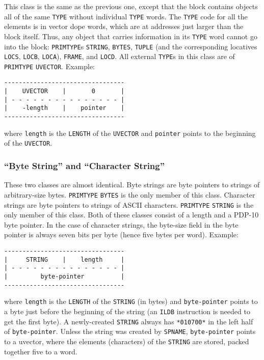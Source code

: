 \documentclass[a4paper]{scrbook}
\begin{document}
This class is the same as the previous one, except that the block contains objects all of the same \texttt{TYPE} without
individual \texttt{TYPE} words. The \texttt{TYPE} code for all the elements is in vector dope words, which are at addresses
just larger than the block itself. Thus, any object that carries information in its \texttt{TYPE} word cannot go into the
block: \texttt{PRIMTYPE}s \texttt{STRING}, \texttt{BYTES}, \texttt{TUPLE} (and
the corresponding locatives \texttt{LOCS}, \texttt{LOCB}, \texttt{LOCA}), \texttt{FRAME}, and
\texttt{LOCD}. All external \texttt{TYPE}s in this class are of \texttt{PRIMTYPE}
\texttt{UVECTOR}. Example:

\begin{verbatim}
---------------------------------
|    UVECTOR    |       0       |
| - - - - - - - - - - - - - - - |
|    -length    |    pointer    |
---------------------------------
\end{verbatim}

where \texttt{length} is the \texttt{LENGTH} of the \texttt{UVECTOR} and \texttt{pointer} points to the beginning of the
\texttt{UVECTOR}.

\subsubsection*{\texorpdfstring{``Byte String'' and ``Character
String''}{Byte String and Character String}}\label{byte-string-and-character-string}

These two classes are almost identical. Byte strings are byte pointers to strings of arbitrary-size bytes.
\texttt{PRIMTYPE} \texttt{BYTES} is the only member of this class. Character strings are byte pointers to strings of ASCII
characters. \texttt{PRIMTYPE} \texttt{STRING} is the only member of this class. Both of these classes consist of a length
and a PDP-10 byte pointer. In the case of character strings, the byte-size field in the byte pointer is always seven bits
per byte (hence five bytes per word). Example:

\begin{verbatim}
---------------------------------
|     STRING    |    length     |
| - - - - - - - - - - - - - - - |
|         byte-pointer          |
---------------------------------
\end{verbatim}

where \texttt{length} is the \texttt{LENGTH} of the \texttt{STRING} (in bytes) and \texttt{byte-pointer} points to a byte
just before the beginning of the string (an \texttt{ILDB} instruction is needed to get the first byte). A newly-created
\texttt{STRING} always has \texttt{*010700*} in the left half of \texttt{byte-pointer}. Unless the string was created by
\texttt{SPNAME}, \texttt{byte-pointer} points to a uvector, where the elements (characters) of the \texttt{STRING} are
stored, packed together five to a word.
\end{document}
